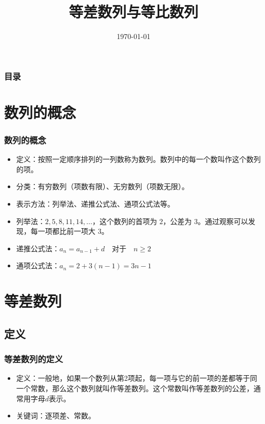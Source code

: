 \documentclass{ctexbeamer}
\title{等差数列与等比数列}
\date{\today}
\begin{document}
\begin{frame}
\titlepage
\end{frame}

\begin{frame}
\frametitle{目录}
\tableofcontents
\end{frame}

\section{数列的概念}
\begin{frame}
\frametitle{数列的概念}
\begin{itemize}
    \item 定义：按照一定顺序排列的一列数称为\alert{数列}。数列中的每一个数叫作这个数列的\alert{项}。
    \item 分类：\alert{有穷数列}（项数有限）、\alert{无穷数列}（项数无限）。
    \item 表示方法：\alert{列举法}、\alert{递推公式法}、\alert{通项公式法}等。
    \item 列举法：$2, 5, 8, 11, 14, \ldots$，这个数列的首项为 \(2\)，公差为 \(3\)。通过观察可以发现，每一项都比前一项大 \(3\)。
    \item 递推公式法：$a_n = a_{n-1} + d \quad \text{对于} \quad n \geq 2$
    \item 通项公式法：$a_n = 2 + 3(n - 1) = 3n - 1$
\end{itemize}
\end{frame}

\section{等差数列}
\subsection{定义}
\begin{frame}
\frametitle{等差数列的定义}
\begin{itemize}
    \item 定义：一般地，如果一个数列从第2项起，每一项与它的前一项的差都等于同一个常数，那么这个数列就叫作\alert{等差数列}。这个常数叫作等差数列的\alert{公差}，通常用字母\alert{$d$}表示。
    \item 关键词：逐项差、常数。
\end{itemize}
\end{frame}
\end{document}
